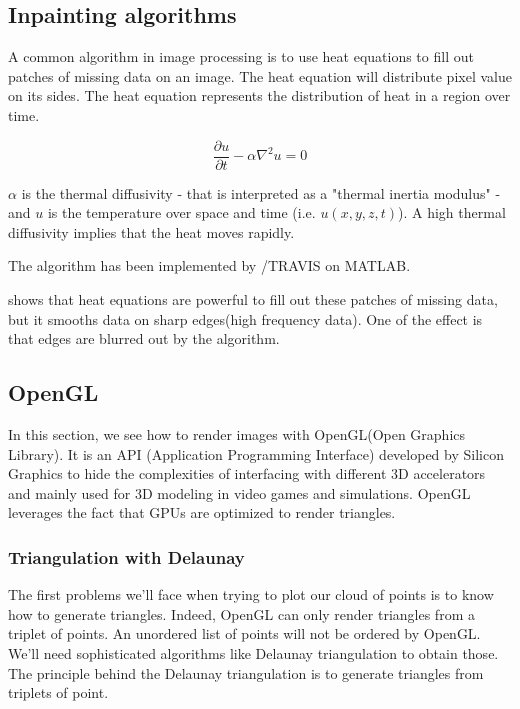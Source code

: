 \subsection{Inpainting algorithms}

A common algorithm in image processing is to use heat equations to fill out patches of missing data on an image. The heat equation will distribute pixel value on its sides. The heat equation represents the distribution of heat in a region over time.

\begin{equation}\label{eqn:heateq}
\frac{\partial u}{\partial t} - \alpha \nabla^2 u = 0
\end{equation}


$\alpha$ is the thermal diffusivity - that is interpreted as a "thermal inertia modulus" - and $u$ is the temperature over space and time (i.e. $u(x,y,z,t)$). A high thermal diffusivity implies that the heat moves rapidly.

The algorithm has been implemented by /TRAVIS on MATLAB.

\cite{aubert2006mathematical} shows that heat equations are powerful to fill out these patches of missing data, but it smooths data on sharp edges(high frequency data). One of the effect is that edges are blurred out by the algorithm.


\subsection{OpenGL}

In this section, we see how to render images with OpenGL(Open Graphics Library). It is an API (Application Programming Interface) developed by Silicon Graphics to hide the complexities of interfacing with different 3D accelerators and mainly used for 3D modeling in video games and simulations. OpenGL leverages the fact that GPUs are optimized to render triangles.

\subsubsection{Triangulation with Delaunay}

The first problems we'll face when trying to plot our cloud of points is to know how to generate triangles. Indeed, OpenGL can only render triangles from a triplet of points. An unordered list of points will not be ordered by OpenGL. We'll need sophisticated algorithms like Delaunay triangulation to obtain those.
The principle behind the Delaunay triangulation is to generate triangles from triplets of point. 


